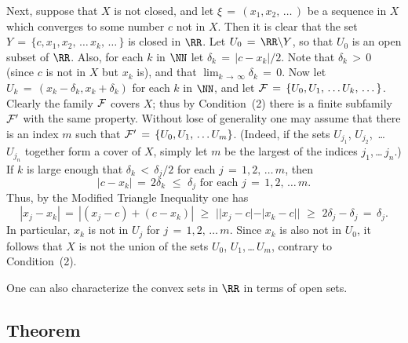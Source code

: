         Next, suppose that $X$ is not closed, and let ${\xi} \,=\, (x_{1},x_{2},\,{\ldots}\,)$ be a sequence in $X$ which converges to some number $c$ not in $X$.
    Then it is clear that the set $Y \,=\, \{c,x_{1},x_{2},\,{\ldots}\,x_{k},\,{\ldots}\,\}$ is closed in ${\RR}$.
    Let $U_{0} \,=\, {\RR}{\setminus}Y$, so that $U_{0}$ is an open subset of ${\RR}$. Also, for each $k$ in ${\NN}$ let ${\delta}_{k} \,=\, |c-x_{k}|/2$.
    Note that ${\delta}_{k}\,>\,0$ (since $c$ is not in $X$ but $x_{k}$ is), and that $\lim_{k \,{\rightarrow}\, {\infty}} {\delta}_{k} \,=\, 0$.
    Now let $U_{k} \,=\, (x_{k}-{\delta}_{k},x_{k}+{\delta}_{k})$ for each $k$ in ${\NN}$,
    and let ${\cal F} \,=\, \{U_{0},U_{1},\,{\ldots}\,U_{k},\,{\ldots}\,\}$.
    Clearly the family ${\cal F}$ covers $X$; thus by Condition~(2) there is a finite subfamily ${\cal F}'$ with the same property.
    Without lose of generality one may assume that there is an index $m$ such that ${\cal F}' \,=\, \{U_{0},U_{1},\,{\ldots}\,U_{m}\}$.
    (Indeed, if the sets $U_{j_{1}}$, $U_{j_{2}}$, \,{\ldots}\, $U_{j_{n}}$ together form a cover of $X$,
    simply let $m$ be the largest of the indices $j_{1}$,\,{\ldots}\,$j_{n}$.)
    If $k$ is large enough that ${\delta}_{k}\,<\,{\delta}_{j}/2$ for each $j \,=\, 1,2,\,{\ldots}\,m$, then
        \begin{displaymath}
        |c-x_{k}| \,=\, 2{\delta}_{k}\,\,{\leq}\,\,{\delta}_{j} \mbox{ for each $j \,=\, 1,2,\,{\ldots}\,m$}.
        \end{displaymath}
    Thus, by the Modified Triangle Inequality one has
        \begin{displaymath}
        |x_{j}-x_{k}| \,=\, |(x_{j}-c) + (c-x_{k})|\,\,{\geq}\,\,||x_{j}-c| - |x_{k}-c||\,\,{\geq}\,\, 2{\delta}_{j} - {\delta}_{j} \,=\, {\delta}_{j}.
        \end{displaymath}
    In particular, $x_{k}$ is not in $U_{j}$ for $j \,=\, 1,2,\,{\ldots}\,m$. Since $x_{k}$ is also not in $U_{0}$,
    it follows that $X$ is not the union of the sets $U_{0}$, $U_{1}$,\,{\ldots}\,$U_{m}$, contrary to Condition~(2).

\V
\V

        One can also characterize the convex sets in ${\RR}$ in terms of open sets.

\V 

             \subsection{\small{\bf Theorem}}
            \label{ThmF30.50}

